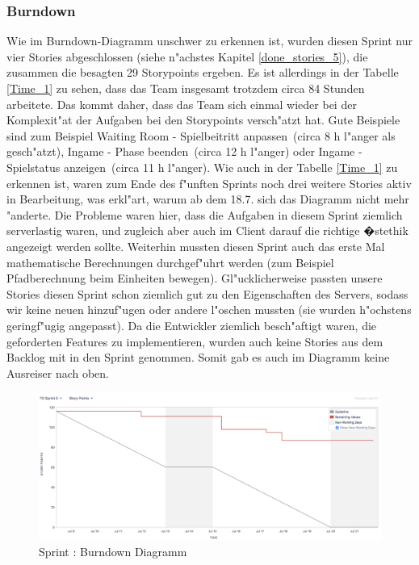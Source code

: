 \documentclass[12pt, titlepage]{scrartcl}
\newcommand{\RN}[1]{%
	\textup{\uppercase\expandafter{\romannumeral#1}}%
}
\begin{document}
        	\subsubsection{Burndown}
        		Wie im Burndown-Diagramm unschwer zu erkennen ist, wurden diesen Sprint nur vier Stories abgeschlossen (siehe n"achstes Kapitel \ref{done_stories_5}), die zusammen die besagten 29 Storypoints ergeben. Es ist allerdings in der Tabelle \ref{Time_1} zu sehen, dass das Team insgesamt trotzdem circa 84 Stunden arbeitete. Das kommt daher, dass das Team sich einmal wieder bei der Komplexit"at der Aufgaben bei den Storypoints versch"atzt hat. Gute Beispiele sind zum Beispiel \glqq Waiting Room - Spielbeitritt anpassen\grqq\ (circa 8 h l"anger als gesch"atzt), \glqq Ingame - Phase beenden\grqq\ (circa 12 h l"anger) oder \glqq Ingame - Spielstatus anzeigen\grqq\ (circa 11 h l"anger). Wie auch in der Tabelle \ref{Time_1} zu erkennen ist, waren zum Ende des f"unften Sprints noch drei weitere Stories aktiv in Bearbeitung, was erkl"art, warum ab dem 18.7. sich das Diagramm nicht mehr "anderte. Die Probleme waren hier, dass die Aufgaben in diesem Sprint ziemlich serverlastig waren, und zugleich aber auch im Client darauf die richtige �stethik angezeigt werden sollte. Weiterhin mussten diesen Sprint auch das erste Mal mathematische Berechnungen durchgef"uhrt werden (zum Beispiel Pfadberechnung beim Einheiten bewegen). Gl"ucklicherweise passten unsere Stories diesen Sprint schon ziemlich gut zu den Eigenschaften des Servers, sodass wir keine neuen hinzuf"ugen oder andere l"oschen mussten (sie wurden h"ochstens geringf"ugig angepasst). Da die Entwickler ziemlich besch"aftigt waren, die geforderten Features zu implementieren, wurden auch keine Stories aus dem Backlog mit in den Sprint genommen. Somit gab es auch im Diagramm keine Ausreiser nach oben.
	        	\begin{figure}[H] 
	        		\centering
	        		\includegraphics[width=\textwidth]{images/sprintV/burndown.png}
	        		\caption{Sprint \RN{5}: Burndown Diagramm}
	        		\label{Burndown_5}
	        	\end{figure} 
\end{document}
